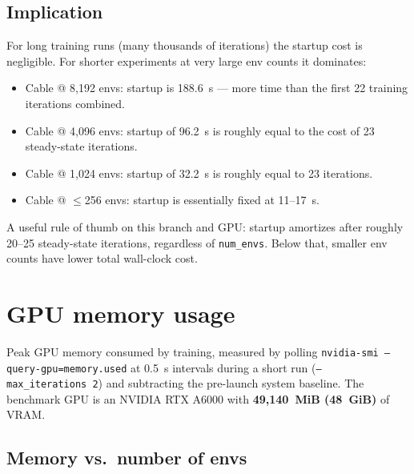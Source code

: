 \documentclass[11pt,a4paper]{article}
\begin{document}
\subsection{Implication}

For long training runs (many thousands of iterations) the startup cost is
negligible. For shorter experiments at very large env counts it dominates:
\begin{itemize}\setlength\itemsep{2pt}
  \item Cable @ 8{,}192 envs: startup is 188.6~s --- more time than the
    first 22 training iterations combined.
  \item Cable @ 4{,}096 envs: startup of 96.2~s is roughly equal to the
    cost of 23 steady-state iterations.
  \item Cable @ 1{,}024 envs: startup of 32.2~s is roughly equal to 23
    iterations.
  \item Cable @ $\leq$256 envs: startup is essentially fixed at 11--17~s.
\end{itemize}

A useful rule of thumb on this branch and GPU: startup amortizes after
roughly 20--25 steady-state iterations, regardless of \texttt{num\_envs}.
Below that, smaller env counts have lower total wall-clock cost.

\section{GPU memory usage}

Peak GPU memory consumed by training, measured by polling
\texttt{nvidia-smi --query-gpu=memory.used} at 0.5~s intervals during a
short run (\texttt{--max\_iterations~2}) and subtracting the
pre-launch system baseline. The benchmark GPU is an NVIDIA RTX A6000 with
\textbf{49{,}140~MiB (48~GiB)} of VRAM.

\subsection{Memory vs.\ number of envs}
\end{document}
